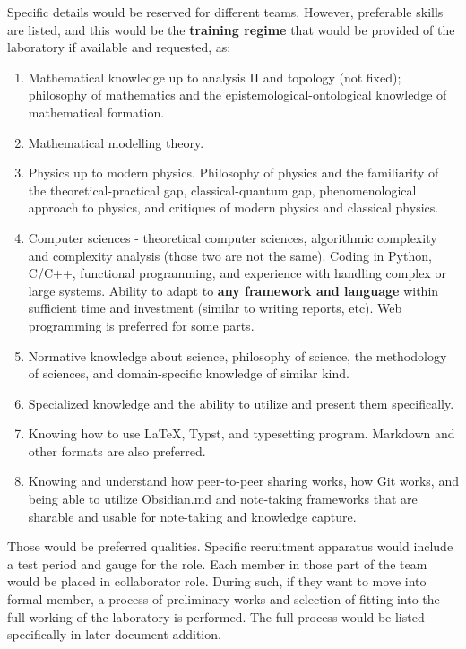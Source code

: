 \documentclass[9pt,a4paper]{article}
\begin{document}
Specific details would be reserved for different teams. However, preferable skills are listed, and this would be the \textbf{training regime} that would be provided of the laboratory if available and requested, as:
\begin{enumerate}
    \item Mathematical knowledge up to analysis II and topology (not fixed); philosophy of mathematics and the epistemological-ontological knowledge of mathematical formation. 
    \item Mathematical modelling theory. 
    \item Physics up to modern physics. Philosophy of physics and the familiarity of the theoretical-practical gap, classical-quantum gap, phenomenological approach to physics, and critiques of modern physics and classical physics. 
    \item Computer sciences - theoretical computer sciences, algorithmic complexity and complexity analysis (those two are not the same). Coding in Python, C/C++, functional programming, and experience with handling complex or large systems. Ability to adapt to \textbf{any framework and language} within sufficient time and investment (similar to writing reports, etc). Web programming is preferred for some parts. 
    \item Normative knowledge about science, philosophy of science, the methodology of sciences, and domain-specific knowledge of similar kind. 
    \item Specialized knowledge and the ability to utilize and present them specifically. 
    \item Knowing how to use \LaTeX, Typst, and typesetting program. Markdown and other formats are also preferred. 
    \item Knowing and understand how peer-to-peer sharing works, how Git works, and being able to utilize \textsf{Obsidian.md} and note-taking frameworks that are sharable and usable for note-taking and knowledge capture. 
\end{enumerate}

Those would be preferred qualities. Specific recruitment apparatus would include a test period and gauge for the role. Each member in those part of the team would be placed in collaborator role. During such, if they want to move into formal member, a process of preliminary works and selection of fitting into the full working of the laboratory is performed. The full process would be listed specifically in later document addition.
\end{document}
